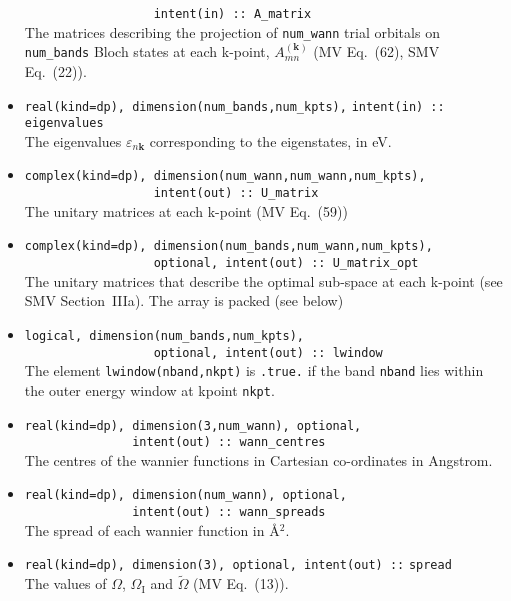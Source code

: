 \begin{itemize}
      \verb#                  intent(in) :: A_matrix# \\The matrices
      describing the projection of \verb#num_wann# trial orbitals on
      \verb#num_bands# Bloch states at each k-point,
      $A_{mn}^{(\mathbf{k})}$ (MV Eq.~(62), SMV Eq.~(22)).
\item \verb#real(kind=dp), dimension(num_bands,num_kpts),#
      \verb#intent(in) :: eigenvalues#\\ The
      eigenvalues $\varepsilon_{n\mathbf{k}}$ corresponding to the
      eigenstates, in eV.
\item \verb#complex(kind=dp), dimension(num_wann,num_wann,num_kpts),#\\
      \verb#                  intent(out) :: U_matrix#\\ The unitary
      matrices at each k-point (MV Eq.~(59))
\item \verb#complex(kind=dp), dimension(num_bands,num_wann,num_kpts),#\\
      \verb#                  optional, intent(out) :: U_matrix_opt#\\ The
      unitary matrices that describe the optimal sub-space at each
      k-point (see SMV Section~{\sc IIIa}). The array is packed (see below)
\item \verb#logical, dimension(num_bands,num_kpts),#\\
      \verb#                  optional, intent(out) :: lwindow#\\ 
       The element \verb#lwindow(nband,nkpt)# is {\tt .true.} if the band
{\tt nband} lies within the outer energy window at kpoint {\tt nkpt}.
\item \verb#real(kind=dp), dimension(3,num_wann), optional,#\\
      \verb#               intent(out) :: wann_centres#\\ 
      The centres of the wannier
      functions in Cartesian co-ordinates in Angstrom. 
\item \verb#real(kind=dp), dimension(num_wann), optional,#\\
      \verb#               intent(out) :: wann_spreads#\\ 
      The spread of each wannier function in \AA$^{2}$.
\item \verb#real(kind=dp), dimension(3), optional, intent(out) ::#
      \verb#spread#\\ 
      The values of $\Omega$, $\Omega_{\mathrm{I}}$ and
      $\tilde{\Omega}$ (MV Eq.~(13)). 
\end{itemize}

